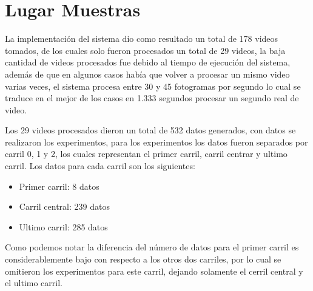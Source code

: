 \section{Lugar Muestras}

La implementación del sistema dio como resultado un total de 178 videos tomados, de los cuales solo fueron procesados un total de 29 videos, la baja cantidad de videos procesados fue debido al tiempo de ejecución del sistema, además de que en algunos casos había que volver a procesar un mismo video varias veces, el sistema procesa entre 30 y 45 fotogramas por segundo lo cual se traduce en el mejor de los casos en 1.333 segundos procesar un segundo real de video.

Los 29 videos procesados dieron un total de 532 datos generados, con datos se realizaron los experimentos, para los experimentos los datos fueron separados por carril 0, 1 y 2, los cuales representan el primer carril, carril centrar y ultimo carril. Los datos para cada carril son los siguientes:

\begin{itemize}
    \item Primer carril: 8 datos
    \item Carril central: 239 datos
    \item Ultimo carril: 285 datos
\end{itemize}

Como podemos notar la diferencia del número de datos para el primer carril es considerablemente bajo con respecto a los otros dos carriles, por lo cual se omitieron los experimentos para este carril, dejando solamente el cerril central y el ultimo carril.
